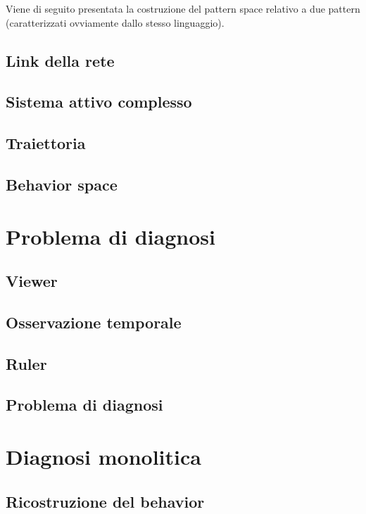 \begin{ex}
Viene di seguito presentata la costruzione del pattern space relativo a due pattern (caratterizzati ovviamente dallo stesso linguaggio).
\end{ex}

\subsection{Link della rete}

\subsection{Sistema attivo complesso}

\subsection{Traiettoria}

\subsection{Behavior space}

\section{Problema di diagnosi}
\subsection{Viewer}

\subsection{Osservazione temporale}

\subsection{Ruler}

\subsection{Problema di diagnosi}

\section{Diagnosi monolitica}
\subsection{Ricostruzione del behavior}

